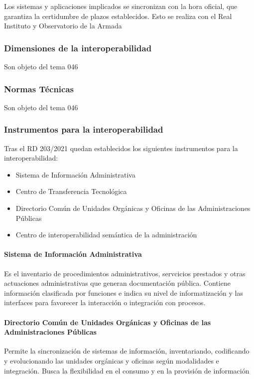         Los sistemas y aplicaciones implicados se sincronizan con la hora oficial, que garantiza la certidumbre de plazos establecidos. Esto se realiza con el Real Instituto y Observatorio de la Armada 

    \subsubsection{Dimensiones de la interoperabilidad} %
        Son objeto del tema 046

    \subsubsection{Normas Técnicas} %
        Son objeto del tema 046

    \subsubsection{Instrumentos para la interoperabilidad} %
        Tras el RD 203/2021 quedan establecidos los siguientes instrumentos para la interoperabilidad:
        \begin{itemize}
            \item Sistema de Información Administrativa
            \item Centro de Transferencia Tecnológica
            \item Directorio Común de Unidades Orgánicas y Oficinas de las Administraciones Públicas
            \item Centro de interoperabilidad semántica de la administración
        \end{itemize}

        \paragraph{Sistema de Información Administrativa}%
            Es el inventario de procedimientos administrativos, servcicios prestados y otras actuaciones administrativas que generan documentación pública. Contiene información clasificada por funciones e indica su nivel de informatización y las interfaces para favorecer la interacción o integración con procesos.

        \paragraph{Directorio Común de Unidades Orgánicas y Oficinas de las Administraciones Públicas} %
            Permite la sincronización de sistemas de información, inventariando, codificando y evolucionando las unidades orgánicas y oficinas según modalidades e integración. Busca la flexibilidad en el consumo y en la provisión de información

